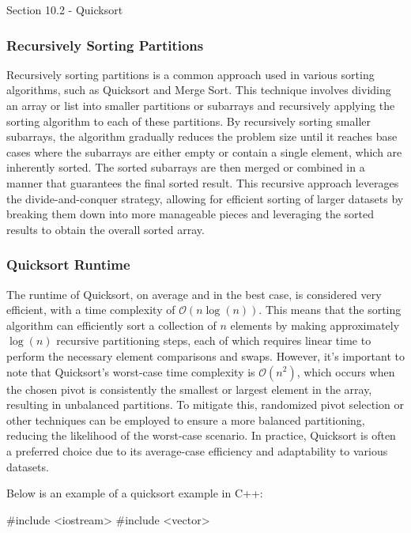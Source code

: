 \begin{notes}{Section 10.2 - Quicksort}
    \subsubsection*{Recursively Sorting Partitions}
    
    Recursively sorting partitions is a common approach used in various sorting algorithms, such as Quicksort and Merge Sort. This technique involves dividing an array or list into smaller partitions or subarrays and recursively applying the sorting algorithm to each of these partitions. By recursively sorting smaller subarrays, the algorithm gradually reduces the problem size until it reaches base cases where the subarrays are either empty or contain a single element, which are inherently 
    sorted. The sorted subarrays are then merged or combined in a manner that guarantees the final sorted result. This recursive approach leverages the divide-and-conquer strategy, allowing for efficient sorting of larger datasets by breaking them down into more manageable pieces and leveraging the sorted results to obtain the overall sorted array.
    
    \subsubsection*{Quicksort Runtime}
    
    The runtime of Quicksort, on average and in the best case, is considered very efficient, with a time complexity of $\mathcal{O}(n\log{(n)})$. This means that the sorting algorithm can efficiently sort a collection of $n$ elements by making approximately $\log{(n)}$ recursive partitioning steps, each of which requires linear time to perform the necessary element comparisons and swaps. However, it's important to note that Quicksort's worst-case time complexity is $\mathcal{O}(n^2)$, which 
    occurs when the chosen pivot is consistently the smallest or largest element in the array, resulting in unbalanced partitions. To mitigate this, randomized pivot selection or other techniques can be employed to ensure a more balanced partitioning, reducing the likelihood of the worst-case scenario. In practice, Quicksort is often a preferred choice due to its average-case efficiency and adaptability to various datasets.
    
    \begin{highlight}
        Below is an example of a quicksort example in C++:
    
    \begin{code}[C++]
    #include <iostream>
    #include <vector>
    

\end{code}
\end{highlight}
\end{notes}
